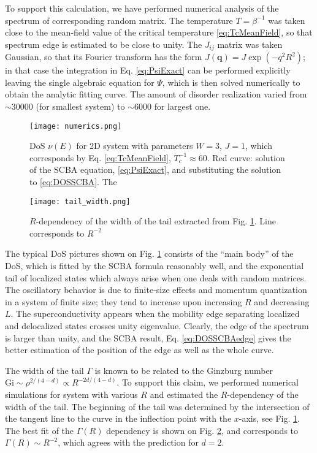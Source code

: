 \documentclass[twocolumn,english,prb]{revtex4-1}
\begin{document}
To support this calculation, we have performed numerical analysis of the spectrum of corresponding random matrix. The temperature $T = \beta^{-1}$ was taken close to the mean-field value of the critical temperature \eqref{eq:TcMeanField}, so that spectrum edge is estimated to be close to unity. The $J_{ij}$ matrix was taken Gaussian, so that its Fourier transform has the form $J(\boldsymbol{q}) = J \exp(-q^2 R^2)$; in that case the integration in Eq. \eqref{eq:PsiExact} can be performed explicitly leaving the single algebraic equation for $\Psi$, which is then solved numerically to obtain the analytic fitting curve. The amount of disorder realization varied from $\sim$30000 (for smallest system) to $\sim$6000 for largest one.

\begin{figure}
	\texttt{[image: numerics.png]}
	\caption{DoS $\nu(E)$ for 2D system with parameters $W = 3$, $J = 1$, which corresponds by Eq. \eqref{eq:TcMeanField}, $T_c^{-1} \approx 60$. Red curve: solution of the SCBA equation, \eqref{eq:PsiExact}, and substituting the solution to \eqref{eq:DOSSCBA}. The}
	\label{fig:DOS}
\end{figure}

\begin{figure}
	\texttt{[image: tail\_width.png]}
	\caption{$R$-dependency of the width of the tail extracted from Fig. \ref{fig:DOS}. Line corresponds to $R^{-2}$}
	\label{fig:tails}
\end{figure}

The typical DoS pictures shown on Fig. \ref{fig:DOS} consists of the ``main body'' of the DoS, which is fitted by the SCBA formula reasonably well, and the exponential tail of localized states which always arise when one deals with random matrices. The oscillatory behavior is due to finite-size effects and momentum quantization in a system of finite size; they tend to increase upon increasing $R$ and decreasing $L$. The superconductivity  appears when the mobility edge separating localized and delocalized states crosses unity eigenvalue. Clearly, the edge of the spectrum is larger than unity, and the SCBA result, Eq. \eqref{eq:DOSSCBAedge} gives the better estimation of the position of the edge as well as the whole curve.

The width of the tail $\Gamma$ is known to be related to the Ginzburg number $\mathrm{Gi} \sim \rho^{2 / (4-d)} \propto R^{-2d/(4-d)}$. To support this claim, we performed numerical simulations for system with various $R$ and estimated the $R$-dependency of the width of the tail. The beginning of the tail was determined by the intersection of the tangent line to the curve in the inflection point with the $x$-axis, see Fig. \ref{fig:DOS}. The best fit of the $\Gamma(R)$ dependency is shown on Fig. \ref{fig:tails}, and corresponds to $\Gamma(R) \sim R^{-2}$, which agrees with the prediction for $d = 2$.
\end{document}
